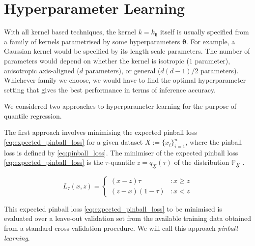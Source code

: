 \documentclass[twoside]{article} \usepackage{aistats2017}
\theoremstyle{definition}
\theoremstyle{remark}
\newcommand{\rv}[1]{\underline{#1}}
\newcommand{\ds}[1]{{#1}}
\begin{document}
\section{Hyperparameter Learning}
\label{sec:hyperparameter_learning}

	With all kernel based techniques, the kernel $k = k_{\bm{\theta}}$ itself is usually specified from a family of kernels parametrised by some hyperparameters $\bm{\theta}$. For example, a Gaussian kernel would be specified by its length scale parameters. The number of parameters would depend on whether the kernel is isotropic ($1$ parameter), anisotropic axis-aligned ($d$ parameters), or general ($d(d - 1)/2$ parameters). Whichever family we choose, we would have to find the optimal hyperparameter setting that gives the best performance in terms of inference accuracy.
	
	We considered two approaches to hyperparameter learning for the purpose of quantile regression.
	
	
	The first approach involves minimising the expected pinball loss \eqref{eq:expected_pinball_loss} for a given dataset $\ds{X} := \{x_{i}\}_{i = 1}^{n}$, where the pinball loss is defined by \eqref{eq:pinball_loss}. The minimiser of the expected pinball loss \eqref{eq:expected_pinball_loss} is the $\tau$-quantile $z = q_{\rv{X}}(\tau)$ of the distribution $\mathbb{P}_{\rv{X}}$ \citep{Koenker1978}.
	
	\begin{equation}
		L_{\tau}(x, z) = \left\{ \begin{array}{lr}
			(x - z) \tau & : x \geq z \\
			(z - x) (1 - \tau) & : x < z
		\end{array} \right.
	\label{eq:pinball_loss}
	\end{equation}
	
	This expected pinball loss \eqref{eq:expected_pinball_loss} to be minimised is evaluated over a leave-out validation set from the available training data obtained from a standard cross-validation procedure. We will call this approach \textit{pinball learning}.
	
\end{document}

